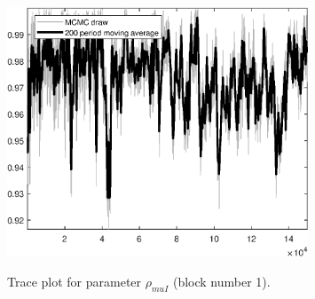 \begin{figure}[H]
\centering
  \includegraphics[width=0.8\textwidth]{BRS_sectoral_KK/graphs/TracePlot_rho_muI_blck_1}\\
    \caption{Trace plot for parameter ${\rho_{muI}}$ (block number 1).}
\end{figure}
